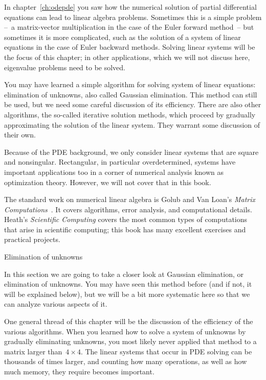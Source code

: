 In chapter~\ref{ch:odepde} you saw how the numerical solution of
partial differential equations can lead to linear algebra
problems. Sometimes this is a simple problem --~a matrix-vector
multiplication in the case of the Euler forward method~-- but
sometimes it is more complicated, such as the solution of a system of
linear equations in the case of Euler backward methods. Solving linear
systems will be the focus of this chapter; in other applications,
which we will not discuss here, eigenvalue problems need to be solved.

You may have learned a simple
algorithm for solving system of linear equations: elimination of
unknowns, also called Gaussian elimination. This method can still be
used, but we need some careful discussion of its efficiency. There are
also other algorithms, the so-called iterative solution methods, which
proceed by gradually approximating the solution of the linear
system. They warrant some discussion of their own.

Because of the PDE background, we only consider linear systems that
are square and nonsingular. Rectangular, in particular overdetermined,
systems have important applications too in a corner of numerical
analysis known as optimization theory. However, we will not cover
that in this book.

The standard work on numerical linear algebra is Golub and Van Loan's
{\it Matrix Computations}~\cite{GoVL:matcomp}.  It covers algorithms,
error analysis, and computational details.  Heath's {\it Scientific
  Computing} covers the most common types of computations that arise
in scientific computing; this book has many excellent exercises and
practical projects.

 {Elimination of unknowns}
\label{sec:gauss-example}

In this section we are going to take a closer look at Gaussian
elimination, or elimination of unknowns. You may have seen this method
before (and if not, it will be explained below), but we will be a bit
more systematic here so that we can analyze various aspects of it.

One general thread of this chapter will be the discussion of the
efficiency of the various algorithms. When you learned how to solve a
system of unknowns by gradually eliminating unknowns, you most likely
never applied that method to a matrix larger than~$4\times4$. The
linear systems that occur in PDE solving can be thousands of times
larger, and counting how many operations, as well as how much memory,
they require becomes important.

